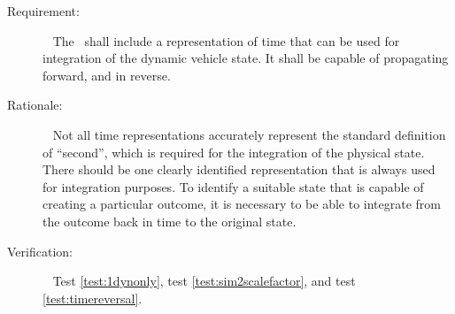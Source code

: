 %
%
% 
%


\label{reqt:physicaltime}
\begin{description}
\item[Requirement:]\ \newline
The \timeDesc\ shall include a representation of time that can be used for 
integration of the dynamic vehicle state.  It shall be capable of propagating 
forward, and in reverse.
\item[Rationale:]\ \newline
Not all time representations accurately represent the standard definition of 
``second'', which is required for the integration of the physical state.  There 
should be one clearly identified representation that is always used for 
integration purposes.  
To identify a suitable state that is capable of creating a particular outcome, 
it is necessary to be able to integrate from the outcome back in time to the 
original state.

\item[Verification:]\ \newline
Test \vref{test:1dynonly}, test \vref{test:sim2scalefactor}, and test 
\vref{test:timereversal}.
\end{description}

